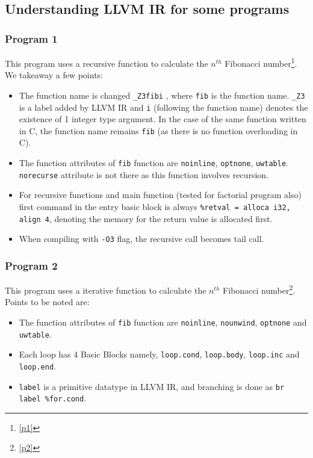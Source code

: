 \documentclass{article}
\begin{document}
\subsection{Understanding LLVM IR for some programs}
\subsubsection{Program 1}
\begin{flushleft}
This program uses a recursive function to calculate the \(n^{th}\) Fibonacci number\footnote{\ref{p1}}. We takeaway a few points:
\begin{itemize}
\item The function name is changed \texttt{\_Z3fibi} , where \texttt{fib} is the function name. \texttt{\_Z3} is a label added by LLVM IR and \texttt{i} (following the function name) denotes the existence of 1 integer type argument. In the case of the same function written in C, the function name remains \texttt{fib} (as there is no function overloading in C).
\item The function attributes of \texttt{fib} function are \texttt{noinline}, \texttt{optnone}, \texttt{uwtable}. \texttt{norecurse} attribute is not there as this function involves recursion.
\item For recursive functions and main function (tested for factorial program also) first command in the entry basic block is always \texttt{\%retval = alloca i32, align 4}, denoting the memory for the return value is allocated first.
\item When compiling with \texttt{-O3} flag, the recursive call becomes tail call.
\end{itemize}
\end{flushleft}

\subsubsection{Program 2}
\begin{flushleft}
This program uses a iterative function to calculate the \(n^{th}\) Fibonacci number\footnote{\ref{p2}}. Points to be noted are:
\begin{itemize}
\item The function attributes of \texttt{fib} function are \texttt{noinline}, \texttt{nounwind}, \texttt{optnone} and \texttt{uwtable}.
\item Each loop has 4 Basic Blocks namely, \texttt{loop.cond}, \texttt{loop.body}, \texttt{loop.inc} and \texttt{loop.end}.
\item \texttt{label} is a primitive datatype in LLVM IR, and branching is done as \texttt{br label \%for.cond}.
\end{itemize}
\end{flushleft}
\end{document}
